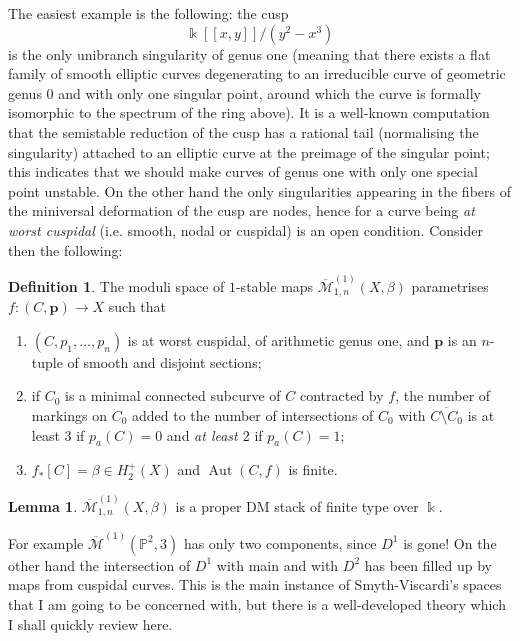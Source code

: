 \documentclass[11pt]{amsart}
\newcommand{\pazocal}{\mathcal}
\newcommand{\oM}{\overline{\mathcal{M}}}
\newcommand{\Mone}[3]{\overline{\pazocal M}^{(1)}_{1,#1}(#2,#3)}
\newcommand{\PP}{\mathbb P}
\renewcommand{\to}{\rightarrow}
\newcommand{\kk}{\Bbbk}
\newcommand{\Aut}{\operatorname{Aut}}
\theoremstyle{definition}
\newtheorem{lemma}[thm]{Lemma}
\theoremstyle{definition}
\newtheorem{dfn}[thm]{Definition}
\begin{document}
The easiest example is the following: the cusp
\[\kk[\![x,y]\!]/(y^2-x^3)\]
is the only unibranch singularity of genus one (meaning that there exists a flat family of smooth elliptic curves degenerating to an irreducible curve of geometric genus $0$ and with only one singular point, around which the curve is formally isomorphic to the spectrum of the ring above). It is a well-known computation \cite[\S 3.C]{HM} that the semistable reduction of the cusp has a rational tail (normalising the singularity) attached to an elliptic curve at the preimage of the singular point; this indicates that we should make curves of genus one with only one special point unstable. On the other hand the only singularities appearing in the fibers of the miniversal deformation of the cusp are nodes, hence for a curve being \emph{at worst cuspidal} (i.e. smooth, nodal or cuspidal) is an open condition. Consider then the following:
\begin{dfn}
 The moduli space of $1$-stable maps $\Mone{n}{X}{\beta}$ parametrises $f\colon (C,\mathbf p)\to X$ such that
 \begin{enumerate}
  \item $(C,p_1,\ldots,p_n)$ is at worst cuspidal, of arithmetic genus one, and $\mathbf p$ is an $n$-tuple of smooth and disjoint sections;
  \item if $C_0$ is a minimal connected subcurve of $C$ contracted by $f$, the number of markings on $C_0$ added to the number of intersections of $C_0$ with $\overline{C\setminus C_0}$ is at least $3$ if $p_a(C)=0$ and \emph{at least $2$} if $p_a(C)=1$;
  \item $f_*[C]=\beta\in H^+_2(X)$ and $\Aut(C,f)$ is finite.
 \end{enumerate}
\end{dfn}
\begin{lemma}
 $\Mone{n}{X}{\beta}$ is a proper DM stack of finite type over $\kk$.
\end{lemma}
For example $\oM^{(1)}(\PP^2,3)$ has only two components, since $D^1$ is gone! On the other hand the intersection of $D^1$ with main and with $D^2$ has been filled up by maps from cuspidal curves. This is the main instance of Smyth-Viscardi's spaces that I am going to be concerned with, but there is a well-developed theory which I shall quickly review here.
\end{document}
